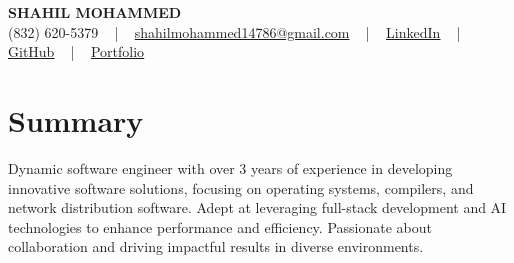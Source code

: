\documentclass[letterpaper,10pt]{article}
\begin{document}
\begin{center}
    {\fontsize{14pt}{12pt}\selectfont \textbf{\MakeUppercase{Shahil Mohammed}}}\\ \vspace{2pt}
    \fontsize{10pt}{12pt}\selectfont (832) 620-5379 ~ | ~ \href{mailto:shahilmohammed14786@gmail.com}{shahilmohammed14786@gmail.com} ~ | ~  
    \href{https://www.linkedin.com/in/shahil-mohammed-9652931a1/}{\color{blue}\underline{LinkedIn}}  ~ | ~ 
    \href{https://github.com/freakbeast14}{\color{blue}\underline{GitHub}} ~ | ~ 
    \href{https://shahil-mohammed.netlify.app/}{\color{blue}\underline{Portfolio}}
    \vspace{-8pt}
\end{center}

\section{Summary}
\vspace{-2pt}\fontsize{8pt}{9pt}\selectfont
Dynamic software engineer with over 3 years of experience in developing innovative software solutions, focusing on operating systems, compilers, and network distribution software. Adept at leveraging full-stack development and AI technologies to enhance performance and efficiency. Passionate about collaboration and driving impactful results in diverse environments.
 \vspace{-5pt}
 
\vspace{-2pt}
\end{document}
